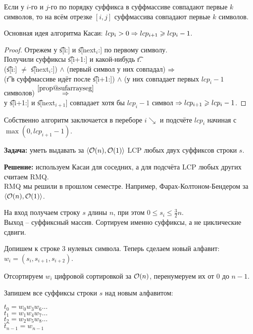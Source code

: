 \begin{Prop}\label{prop@sufarrayseg}
Если у $i$-го и $j$-го по порядку суффикса в суффмассиве совпадают первые $k$ символов, 
то на всём отрезке $[i,j]$ суффмассива совпадают первые $k$ символов.
\end{Prop}

\begin{Lm}
Основная идея алгоритма Касаи: $lcp_i > 0 \Rightarrow lcp_{i+1} \geqslant lcp_i - 1$.
\end{Lm}
\begin{proof}
Отрежем у \t{s[i:]} и \t{s[next$_i$:]} по первому символу.\\
Получили суффиксы \t{s[i+1:]} и какой-нибудь \t{r}.\\
(\t{s[i:]} $\not=$ \t{s[next$_i$:]}) $\wedge$ (первый символ у них совпадал) $\Rightarrow$ \\
(\t{r} в суффмассиве идёт после \t{s[i+1:]}) $\wedge$ (у них совпадает первых $lcp_i{-}1$ символов) $\overset{\autoref{prop@sufarrayseg}}{\SO}$ \\
у \t{s[i+1:]} и \t{s[next$_{i+1}$]} совпадает хотя бы $lcp_i{-}1$ символ $\Rightarrow lcp_{i+1} \geqslant lcp_i-1$.
\end{proof}

Собственно алгоритм заключается в переборе $i \searrow$ и подсчёте $lcp_i$ начиная с $\max(0, lcp_{i+1}{-}1)$.

\down
{\bf Задача:} уметь выдавать за $\langle \mathcal{O}(n), \mathcal{O}(1) \rangle$ LCP любых двух суффиксов строки $s$.

\down
{\bf Решение:} используем Касаи для соседних, а для подсчёта LCP любых других считаем RMQ.\\
RMQ мы решили в прошлом семестре. Например, Фарах-Колтоном-Бендером за $\langle \mathcal{O}(n), \mathcal{O}(1) \rangle$. 

{}

На вход получаем строку $s$ длины $n$, при этом $0 \le s_i \le \frac{3}{2}n$.\\
Выход -- суффиксный массив. Сортируем именно суффиксы, а не циклические сдвиги.

\down
Допишем к строке 3 нулевых символа. Теперь сделаем новый алфавит: $w_i = (s_i, s_{i + 1}, s_{i + 2})$. 

Отсортируем $w_i$ цифровой сортировкой за $\mathcal{O}(n)$, перенумеруем их от $0$ до $n{-}1$.

Запишем все суффиксы строки $s$ над новым алфавитом: 

\down
$t_0 = w_0w_3w_6\dots$ \\
$t_1 = w_1w_4w_7\dots$ \\
$t_2 = w_2w_5w_8\dots$ \\
$\dots$\\
$t_{n-1} = w_{n-1}$

